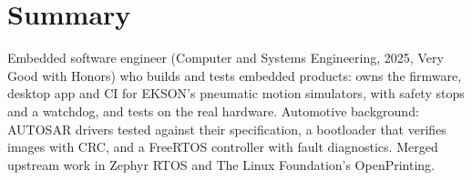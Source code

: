 \documentclass[10pt]{article}
\begin{document}

\section*{Summary}
Embedded software engineer (Computer and Systems Engineering, 2025, Very Good with Honors) who builds and tests embedded products: owns the firmware, desktop app and CI for EKSON's pneumatic motion simulators, with safety stops and a watchdog, and tests on the real hardware. Automotive background: AUTOSAR drivers tested against their specification, a bootloader that verifies images with CRC, and a FreeRTOS controller with fault diagnostics. Merged upstream work in Zephyr RTOS and The Linux Foundation's OpenPrinting.
\end{document}
